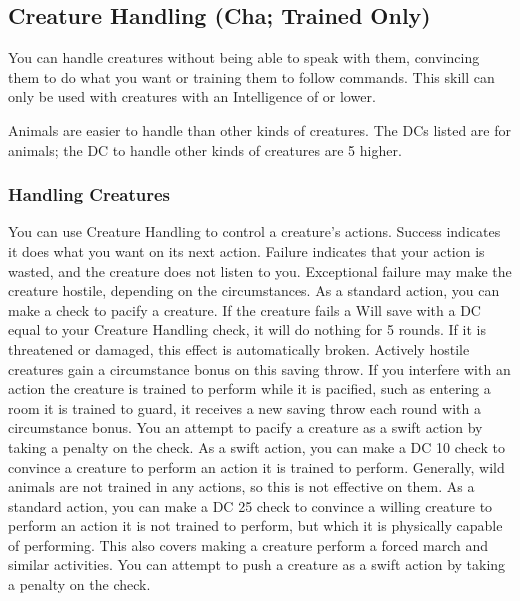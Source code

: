 \subsection{Creature Handling (Cha; Trained Only)}
You can handle creatures without being able to speak with them, convincing them to do what you want or training them to follow commands. This skill can only be used with creatures with an Intelligence of  or lower.

Animals are easier to handle than other kinds of creatures. The DCs listed are for animals; the DC to handle other kinds of creatures are 5 higher.

\subsubsection{Handling Creatures}
You can use Creature Handling to control a creature's actions. Success indicates it does what you want on its next action. Failure indicates that your action is wasted, and the creature does not listen to you. Exceptional failure may make the creature hostile, depending on the circumstances.
 As a standard action, you can make a check to pacify a creature. If the creature fails a Will save with a DC equal to your Creature Handling check, it will do nothing for 5 rounds. If it is threatened or damaged, this effect is automatically broken. Actively hostile creatures gain a  circumstance bonus on this saving throw. If you interfere with an action the creature is trained to perform while it is pacified, such as entering a room it is trained to guard, it receives a new saving throw each round with a  circumstance bonus. You an attempt to pacify a creature as a swift action by taking a  penalty on the check.
 As a swift action, you can make a DC 10 check to convince a creature to perform an action it is trained to perform. Generally, wild animals are not trained in any actions, so this is not effective on them.
 As a standard action, you can make a DC 25 check to convince a willing creature to perform an action it is not trained to perform, but which it is physically capable of performing. This also covers making a creature perform a forced march and similar activities. You can attempt to push a creature as a swift action by taking a  penalty on the check.

